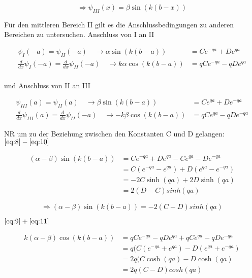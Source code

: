 \begin{equation}
  \label{eq:7}
  \Rightarrow \psi_{III}(x)=\beta\sin(k(b-x))
\end{equation}

Für den mittleren Bereich II gilt es die Anschlussbedingungen zu anderen Bereichen zu untersuchen. Anschluss von I an II


\begin{align}
  \psi_{I}(-a) = \psi_{II}(-a) \quad\rightarrow    \alpha\sin(k(b-a)) &= Ce^{-qa}+De^{qa} \label{eq:8} \\
\frac{d}{dx}\psi_{I}(-a) =\frac{d}{dx}\psi_{II}(-a) \quad \rightarrow   k\alpha\cos(k(b-a)) &= qCe^{-qa}-qDe^{qa}\label{eq:9}
\end{align}
\\
und Anschluss von II an III

\begin{align}
  \psi_{III}(a) = \psi_{II}(a) \quad\rightarrow  \beta\sin(k(b-a)) &= Ce^{qa}+De^{-qa} \label{eq:10} \\
  \frac{d}{dx}\psi_{III}(a) =\frac{d}{dx}\psi_{II}(-a) \quad\rightarrow   -k\beta\cos(k(b-a)) &= qCe^{qa}-qDe^{-qa} \label{eq:11}
\end{align}

NR um zu der Beziehung zwischen den Konstanten C und D gelangen:
\( \eqref{eq:8}-\eqref{eq:10}  \)

\begin{align}
  \label{eq:12}
  (\alpha-\beta)\sin(k(b-a)) &= Ce^{-qa}+De^{qa}- Ce^{qa}-De^{-qa}\\
&= C(e^{-qa}- e^{qa})+D(e^{qa}-e^{-qa})\\
&=-2C\sinh(qa)+2D\sinh(qa)\\
&=2(D-C)sinh(qa)
\end{align}

\begin{equation}
  \label{eq:13}
 \Rightarrow  (\alpha-\beta)\sin(k(b-a))=-2(C-D)sinh(qa)
\end{equation}

\( \eqref{eq:9}+\eqref{eq:11}  \)

\begin{align}
  \label{eq:14}
  k(\alpha-\beta)\cos(k(b-a)) &= qCe^{-qa}-qDe^{qa}+ qCe^{qa}-qDe^{-qa}\\
&= q(C(e^{-qa}+ e^{qa})-D(e^{qa}+e^{-qa})\\
&= 2q(C\cosh(qa)-D\cosh(qa)\\
&=2q(C-D)cosh(qa)
\end{align}

